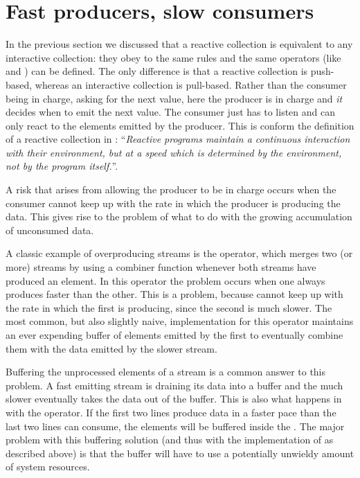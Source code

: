 \section{Fast producers, slow consumers}
\label{sec:fastproc-slowcons}
In the previous section we discussed that a reactive collection is equivalent to any interactive collection: they obey to the same rules and the same operators (like  and ) can be defined. The only difference is that a reactive collection is push-based, whereas an interactive collection is pull-based. Rather than the consumer being in charge, asking for the next value, here the producer is in charge and \emph{it} decides when to emit the next value. The consumer just has to listen and can only react to the elements emitted by the producer. This is conform the definition of a reactive collection in : ``\textit{Reactive programs maintain a continuous interaction with their environment, but at a speed which is determined by the environment, not by the program itself.}''.

A risk that arises from allowing the producer to be in charge occurs when the consumer cannot keep up with the rate in which the producer is producing the data. This gives rise to the problem of what to do with the growing accumulation of unconsumed data.

A classic example of overproducing streams is the  operator, which merges two (or more) streams by using a combiner function whenever both streams have produced an element. In this operator the problem occurs when one \obs always produces faster than the other. This is a problem, because  cannot keep up with the rate in which the first \obs is producing, since the second \obs is much slower. The most common, but also slightly naive, implementation for this operator maintains an ever expending buffer of elements emitted by the first \obs to eventually combine them with the data emitted by the slower stream.

Buffering the unprocessed elements of a stream is a common answer to this problem. A fast emitting stream is draining its data into a buffer and the much slower \obv eventually takes the data out of the buffer. This is also what happens in  with the  operator. If the first two lines produce data in a faster pace than the last two lines can consume, the elements will be buffered inside the . The major problem with this buffering solution (and thus with the implementation of  as described above) is that the buffer will have to use a potentially unwieldy amount of system resources.

